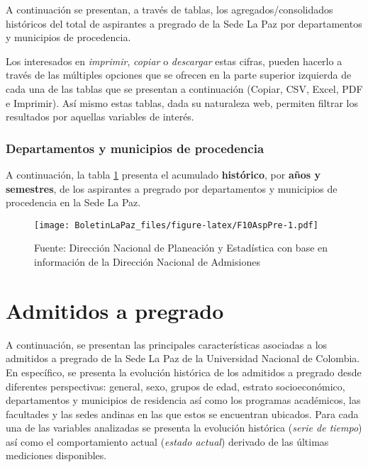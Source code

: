 \documentclass[
]{book}
\begin{document}
A continuación se presentan, a través de tablas, los agregados/consolidados históricos del total de aspirantes a pregrado de la Sede La Paz por departamentos y municipios de procedencia.

Los interesados en \emph{imprimir}, \emph{copiar} o \emph{descargar} estas cifras, pueden hacerlo a través de las múltiples opciones que se ofrecen en la parte superior izquierda de cada una de las tablas que se presentan a continuación (Copiar, CSV, Excel, PDF e Imprimir). Así mismo estas tablas, dada su naturaleza web, permiten filtrar los resultados por aquellas variables de interés.

\hypertarget{departamentos-y-municipios-de-procedencia}{%
\subsubsection{Departamentos y municipios de procedencia}\label{departamentos-y-municipios-de-procedencia}}

A continuación, la tabla \ref{fig:F10AspPre} presenta el acumulado \textbf{histórico}, por \textbf{años y semestres}, de los aspirantes a pregrado por departamentos y municipios de procedencia en la Sede La Paz.

\begin{figure}
\centering
\texttt{[image: BoletinLaPaz\_files/figure-latex/F10AspPre-1.pdf]}
\caption{\label{fig:F10AspPre}Fuente: Dirección Nacional de Planeación y Estadística con base en información de la Dirección Nacional de Admisiones}
\end{figure}

\hypertarget{AdmPre}{%
\section{Admitidos a pregrado}\label{AdmPre}}

A continuación, se presentan las principales características asociadas a los admitidos a pregrado de la Sede La Paz de la Universidad Nacional de Colombia. En específico, se presenta la evolución histórica de los admitidos a pregrado desde diferentes perspectivas: general, sexo, grupos de edad, estrato socioeconómico, departamentos y municipios de residencia así como los programas académicos, las facultades y las sedes andinas en las que estos se encuentran ubicados. Para cada una de las variables analizadas se presenta la evolución histórica (\emph{serie de tiempo}) así como el comportamiento actual (\emph{estado actual}) derivado de las últimas mediciones disponibles.
\end{document}
